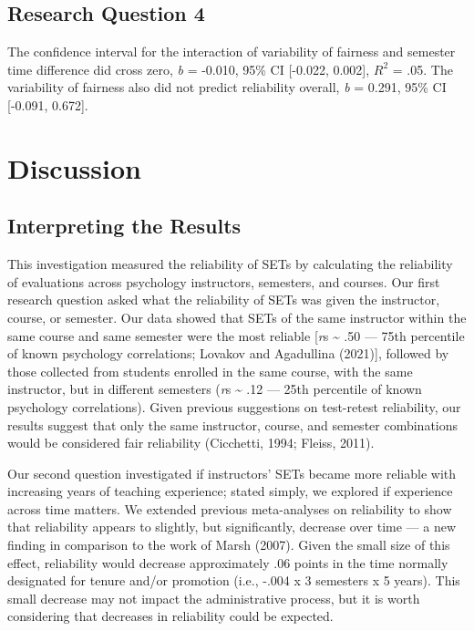 \documentclass[
  man]{apa7}
\begin{document}
\hypertarget{research-question-4-1}{%
\subsection{Research Question 4}\label{research-question-4-1}}

The confidence interval for the interaction of variability of fairness
and semester time difference did cross zero, \emph{b} =
-0.010, 95\% CI
{[}-0.022,
0.002{]}, \(R^2\) =
.05.
The variability of fairness also did not predict reliability overall,
\emph{b} = 0.291, 95\% CI
{[}-0.091,
0.672{]}.

\hypertarget{discussion}{%
\section{Discussion}\label{discussion}}

\hypertarget{interpreting-the-results}{%
\subsection{Interpreting the Results}\label{interpreting-the-results}}

This investigation measured the reliability of SETs by calculating the reliability of evaluations across psychology instructors, semesters, and courses. Our first research question asked what the reliability of SETs was given the instructor, course, or semester. Our data showed that SETs of the same instructor within the same course and same semester were the most reliable {[}\emph{r}s \textasciitilde{} .50 --- 75th percentile of known psychology correlations; Lovakov and Agadullina (2021){]}, followed by those collected from students enrolled in the same course, with the same instructor, but in different semesters (\emph{r}s \textasciitilde{} .12 --- 25th percentile of known psychology correlations). Given previous suggestions on test-retest reliability, our results suggest that only the same instructor, course, and semester combinations would be considered fair reliability (Cicchetti, 1994; Fleiss, 2011).

Our second question investigated if instructors' SETs
became more reliable with increasing years of teaching experience;
stated simply, we explored if experience across time matters. We
extended previous meta-analyses on reliability to show that reliability
appears to slightly, but significantly, decrease over time --- a new
finding in comparison to the work of Marsh (2007). Given the small size of
this effect, reliability would decrease approximately .06 points in the
time normally designated for tenure and/or promotion (i.e., -.004 x 3
semesters x 5 years). This small decrease may not impact the
administrative process, but it is worth considering that decreases in
reliability could be expected.
\end{document}

